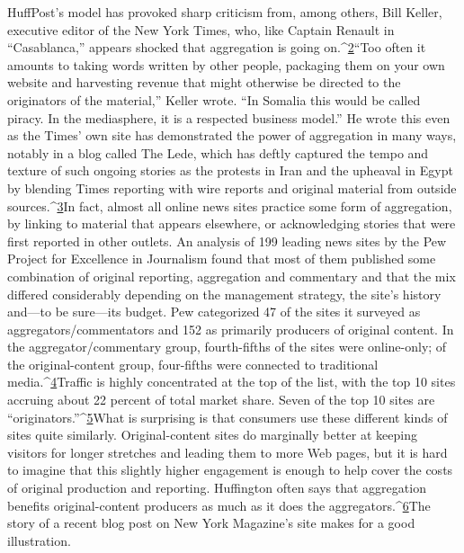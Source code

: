 HuffPost's model has provoked sharp criticism from, among others, Bill Keller,
executive editor of the New York Times, who, like Captain Renault in ``Casablanca,''
appears shocked that aggregation is going on.^{\href{#endnotes-chapter-6}{2}}``Too often it amounts
to taking words written by other people, packaging them on your own website
and harvesting revenue that might otherwise be directed to the originators of
the material,'' Keller wrote. ``In Somalia this would be called piracy. In the mediasphere,
it is a respected business model.'' He wrote this even as the Times' own
site has demonstrated the power of aggregation in many ways, notably in a blog
called The Lede, which has deftly captured the tempo and texture of such ongoing
stories as the protests in Iran and the upheaval in Egypt by blending Times
reporting with wire reports and original material from outside sources.^{\href{#endnotes-chapter-6}{3}}In fact, almost all online news sites practice some form of aggregation, by linking
to material that appears elsewhere, or acknowledging stories that were first
reported in other outlets. An analysis of 199 leading news sites by the Pew Project
for Excellence in Journalism found that most of them published some combination
of original reporting, aggregation and commentary and that the mix differed
considerably depending on the management strategy, the site's history and—to
be sure—its budget.
Pew categorized 47 of the sites it surveyed as aggregators/commentators and
152 as primarily producers of original content. In the aggregator/commentary
group, fourth-fifths of the sites were online-only; of the original-content group,
four-fifths were connected to traditional media.^{\href{#endnotes-chapter-6}{4}}Traffic is highly concentrated at
the top of the list, with the top 10 sites accruing about 22 percent of total market
share. Seven of the top 10 sites are ``originators.''^{\href{#endnotes-chapter-6}{5}}What is surprising is that consumers use these different kinds of sites quite
similarly. Original-content sites do marginally better at keeping visitors for longer
stretches and leading them to more Web pages, but it is hard to imagine that
this slightly higher engagement is enough to help cover the costs of original
production and reporting.
Huffington often says that aggregation benefits original-content producers as
much as it does the aggregators.^{\href{#endnotes-chapter-6}{6}}The story of a recent blog post on New York
Magazine's site makes for a good illustration.
